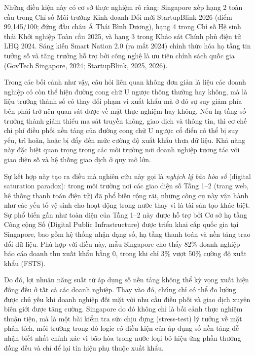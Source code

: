 \documentclass[12pt,a4paper]{article}
\begin{document}
Những điều kiện này có cơ sở thực nghiệm rõ ràng: Singapore xếp hạng 2
toàn cầu trong Chỉ số Môi trường Kinh doanh Đổi mới StartupBlink 2026
(điểm 99,145/100; đứng đầu châu Á Thái Bình Dương), hạng 4 trong Chỉ số
Hệ sinh thái Khởi nghiệp Toàn cầu 2025, và hạng 3 trong Khảo sát Chính
phủ điện tử LHQ 2024. Sáng kiến Smart Nation 2.0 (ra mắt 2024) chính
thức hóa hạ tầng tin tưởng số và tăng trưởng hỗ trợ bởi công nghệ là ưu
tiên chính sách quốc gia (GovTech Singapore, 2024; StartupBlink, 2025,
2026).

Trong các bối cảnh như vậy, câu hỏi liên quan không đơn giản là liệu các
doanh nghiệp có còn thể hiện đường cong chữ U ngược thông thường hay
không, mà là liệu trưởng thành số có thay đổi phạm vi xuất khẩu mà ở đó
sự suy giảm phía bên phải trở nên quan sát được về mặt thực nghiệm hay
không. Nếu hạ tầng số trưởng thành giảm thiểu ma sát truyền thông, giao
dịch và thông tin, thì cơ chế chi phí điều phối nền tảng của đường cong
chữ U ngược cổ điển có thể bị suy yếu, trì hoãn, hoặc bị đẩy đến mức
cường độ xuất khẩu thưa dữ liệu. Khả năng này đặc biệt quan trọng trong
các môi trường nơi doanh nghiệp tương tác với giao diện số và hệ thống
giao dịch ở quy mô lớn.

Sự kết hợp này tạo ra điều mà nghiên cứu này gọi là \emph{nghịch lý bão
hòa số} (digital saturation paradox): trong môi trường nơi các giao diện
số Tầng 1--2 (trang web, hệ thống thanh toán điện tử) đã phổ biến rộng
rãi, những công cụ này vận hành như các yếu tố vệ sinh cho hoạt động
trong nước thay vì là tài sản tạo khác biệt. Sự phổ biến gần như toàn
diện của Tầng 1--2 này được hỗ trợ bởi Cơ sở hạ tầng Công cộng Số
(Digital Public Infrastructure) được triển khai cấp quốc gia tại
Singapore, bao gồm hệ thống nhận dạng số, hạ tầng thanh toán và nền tảng
trao đổi dữ liệu. Phù hợp với điều này, mẫu Singapore cho thấy 82\%
doanh nghiệp báo cáo doanh thu xuất khẩu bằng 0, trong khi chỉ 3\% vượt
50\% cường độ xuất khẩu (FSTS).

Do đó, lợi nhuận năng suất từ áp dụng số nền tảng không thể kỳ vọng xuất
hiện đồng đều ở tất cả các doanh nghiệp. Thay vào đó, chúng chỉ có thể
đo lường được chủ yếu khi doanh nghiệp đối mặt với nhu cầu điều phối và
giao dịch xuyên biên giới được tăng cường. Singapore do đó không chỉ là
bối cảnh thực nghiệm thuận tiện, mà là một bài kiểm tra sức chịu đựng
(stress-test) lý tưởng về mặt phân tích, môi trường trong đó logic có
điều kiện của áp dụng số nền tảng dễ nhận biết nhất chính xác vì bão hòa
trong nước loại bỏ hiệu ứng phần thưởng đồng đều và chỉ để lại tín hiệu
phụ thuộc xuất khẩu.
\end{document}
